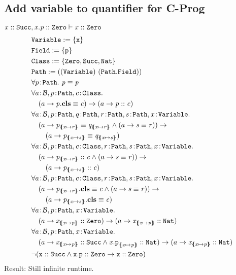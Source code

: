 \documentclass[a4paper]{article}
\begin{document}
\subsection{Add variable to quantifier for C-Prog}
\label{example:field-access-quantified-variable-timeout}
$\mathit{x} :: \mathit{\mathtt{Succ}}, \mathit{x.p} :: \mathit{\mathtt{Zero}} \vdash \mathit{x} :: \mathit{\mathtt{Zero}}$
\begin{align}
  &\texttt{\Variable} := \{\mathtt{x}\}\\
  &\texttt{\Field} := \{\mathtt{p}\}\\
  &\texttt{\Class} := \{\Zero,\Succ,\Nat\}\\
  &\Path := ((\Variable)~(\Path.\Field))\\
  &\forall \sortedVar{p}{\Path}.~\pathEq{p}{p}\\
  &\forall \sortedVar{a}{\TBool}, \sortedVar{p}{\Path}, \sortedVar{c}{\Class}.\\
  &\quad(a \rightarrow \instBy{p}{c}) \rightarrow (a \rightarrow \instOf{p}{c})\\
  &\forall \sortedVar{a}{\TBool}, \sortedVar{p}{\Path}, \sortedVar{q}{\Path}, \sortedVar{r}{\Path}, \sortedVar{s}{\Path}, \sortedVar{x}{\Variable}.\\
  &\quad (a \rightarrow \pathEq{p_{\sub{x}{r}}}{q_{\sub{x}{r}}} \land (a \rightarrow \pathEq{s}{r})) \rightarrow\\
  &\qquad (a \rightarrow \pathEq{p_{\sub{x}{s}}}{q_{\sub{x}{s}}})\\
  &\forall \sortedVar{a}{\TBool}, \sortedVar{p}{\Path}, \sortedVar{c}{\Class}, \sortedVar{r}{\Path}, \sortedVar{s}{\Path}, \sortedVar{x}{\Variable}.\\
  &\quad (a \rightarrow \instOf{p_{\sub{x}{r}}}{c} \land (a \rightarrow \pathEq{s}{r})) \rightarrow\\
  &\qquad (a \rightarrow \instOf{p_{\sub{x}{s}}}{c})\\
  &\forall \sortedVar{a}{\TBool}, \sortedVar{p}{\Path}, \sortedVar{c}{\Class}, \sortedVar{r}{\Path}, \sortedVar{s}{\Path}, \sortedVar{x}{\Variable}.\\
  &\quad (a \rightarrow \instBy{p_{\sub{x}{r}}}{c} \land (a \rightarrow \pathEq{s}{r})) \rightarrow\\
  &\qquad (a \rightarrow \instBy{p_{\sub{x}{s}}}{c})\\
  &\forall \sortedVar{a}{\TBool}, \sortedVar{p}{\Path}, \sortedVar{x}{\Variable}.\\
  &\quad (a \rightarrow \instOf{x_{\sub{x}{p}}}{\Zero}) \rightarrow (a \rightarrow \instOf{x_{\sub{x}{p}}}{\Nat})\\
  &\forall \sortedVar{a}{\TBool}, \sortedVar{p}{\Path}, \sortedVar{x}{\Variable}.\\
  &\quad (a \rightarrow \instOf{x_{\sub{x}{p}}}{\Succ} \land \instOf{x\mathtt{.p}_{\sub{x}{p}}}{\Nat}) \rightarrow (a \rightarrow \instOf{x_{\sub{x}{p}}}{\Nat})\\
  & \neg (\instOf{\mathtt{x}}{\Succ} \land \instOf{\mathtt{x.p}}{\Zero} \rightarrow \instOf{\mathtt{x}}{\Zero})
\end{align}
Result: Still infinite runtime.
\end{document}
